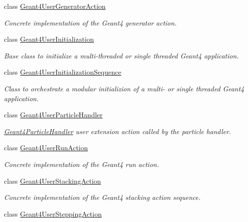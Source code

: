 \begin{DoxyCompactItemize}
class \hyperlink{class_d_d4hep_1_1_simulation_1_1_geant4_user_generator_action}{Geant4\+User\+Generator\+Action}
\begin{DoxyCompactList}\small\item\em Concrete implementation of the Geant4 generator action. \end{DoxyCompactList}\item 
class \hyperlink{class_d_d4hep_1_1_simulation_1_1_geant4_user_initialization}{Geant4\+User\+Initialization}
\begin{DoxyCompactList}\small\item\em Base class to initialize a multi-\/threaded or single threaded Geant4 application. \end{DoxyCompactList}\item 
class \hyperlink{class_d_d4hep_1_1_simulation_1_1_geant4_user_initialization_sequence}{Geant4\+User\+Initialization\+Sequence}
\begin{DoxyCompactList}\small\item\em Class to orchestrate a modular initializion of a multi-\/ or single threaded Geant4 application. \end{DoxyCompactList}\item 
class \hyperlink{class_d_d4hep_1_1_simulation_1_1_geant4_user_particle_handler}{Geant4\+User\+Particle\+Handler}
\begin{DoxyCompactList}\small\item\em \hyperlink{class_d_d4hep_1_1_simulation_1_1_geant4_particle_handler}{Geant4\+Particle\+Handler} user extension action called by the particle handler. \end{DoxyCompactList}\item 
class \hyperlink{class_d_d4hep_1_1_simulation_1_1_geant4_user_run_action}{Geant4\+User\+Run\+Action}
\begin{DoxyCompactList}\small\item\em Concrete implementation of the Geant4 run action. \end{DoxyCompactList}\item 
class \hyperlink{class_d_d4hep_1_1_simulation_1_1_geant4_user_stacking_action}{Geant4\+User\+Stacking\+Action}
\begin{DoxyCompactList}\small\item\em Concrete implementation of the Geant4 stacking action sequence. \end{DoxyCompactList}\item 
class \hyperlink{class_d_d4hep_1_1_simulation_1_1_geant4_user_stepping_action}{Geant4\+User\+Stepping\+Action}

\end{DoxyCompactItemize}
